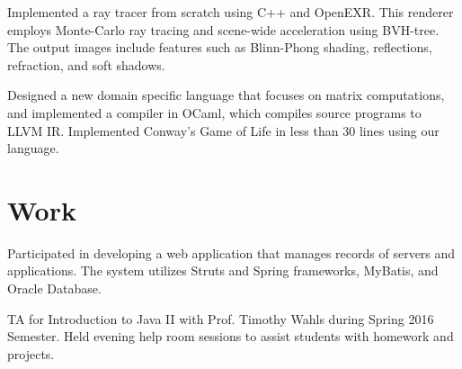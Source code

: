 \documentclass[]{deedy-resume-openfont}
\begin{document}
\begin{minipage}[t]{0.66\textwidth}
Implemented a ray tracer from scratch using C++ and OpenEXR. This renderer employs Monte-Carlo ray tracing and scene-wide acceleration using BVH-tree. The output images include features such as Blinn-Phong shading, reflections, refraction, and soft shadows. 
\sectionsep


Designed a new domain specific language that focuses on matrix computations, and implemented a compiler in OCaml, which compiles source programs to LLVM IR. Implemented Conway's Game of Life in less than 30 lines using our language. 
\sectionsep





\section{Work}

Participated in developing a web application that manages records of servers and applications. 
The system utilizes Struts and Spring frameworks, MyBatis, and Oracle Database.
\sectionsep

TA for Introduction to Java II with Prof. Timothy Wahls during Spring 2016 Semester. Held evening help room sessions to assist students with homework and projects. 
\sectionsep


\end{minipage}
\end{document}
